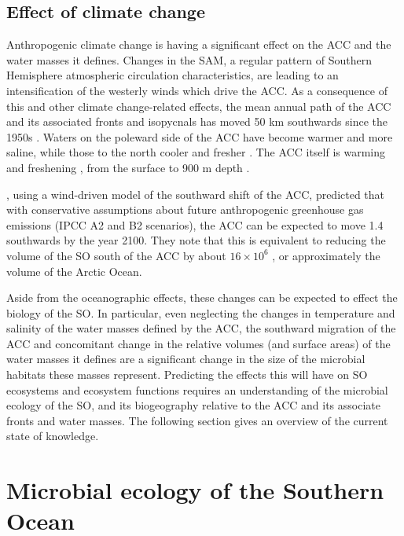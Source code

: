 \subsection{Effect of climate change}

Anthropogenic climate change is having a significant effect on the \ac{ACC} and the water masses it defines.
Changes in the \ac{SAM}, a regular pattern of Southern Hemisphere atmospheric circulation characteristics, are leading to an intensification of the westerly winds \cite{Thompson:2002ic} which drive the \ac{ACC}.
As a consequence of this and other climate change-related effects, the mean annual path of the \ac{ACC} and its associated fronts and isopycnals has moved \textapprox{}50 km southwards since the 1950s \cite{Gille:2002fr}.
Waters on the poleward side of the \ac{ACC} have become warmer and more saline, while those to the north cooler and fresher \cite{Boning:2008il}.
The \ac{ACC} itself is warming and freshening \cite{Boning:2008il}, from the surface to 900 m depth \cite{Aoki:2003fo}.

\citet{Fyfe:2005vp}, using a wind-driven model of the southward shift of the \ac{ACC}, predicted that with conservative assumptions about future anthropogenic greenhouse gas emissions (\ac{IPCC} A2 and B2 scenarios), the \ac{ACC} can be expected to move \textapprox{}1.4\textdegree{} southwards by the year 2100.
They note that this is equivalent to reducing the volume of the \ac{SO} south of the \ac{ACC} by about $16 \times{} 10^{6}$ , or approximately the volume of the Arctic Ocean.

Aside from the oceanographic effects, these changes can be expected to effect the biology of the \ac{SO}.
In particular, even neglecting the changes in temperature and salinity of the water masses defined by the \ac{ACC}, the southward migration of the \ac{ACC} and concomitant change in the relative volumes (and surface areas) of the water masses it defines are a significant change in the size of the microbial habitats these masses represent.
Predicting the effects this will have on \ac{SO} ecosystems and ecosystem functions requires an understanding of the microbial ecology of the \ac{SO}, and its biogeography relative to the \ac{ACC} and its associate fronts and water masses.
The following section gives an overview of the current state of knowledge.

\section{Microbial ecology of the Southern Ocean}

